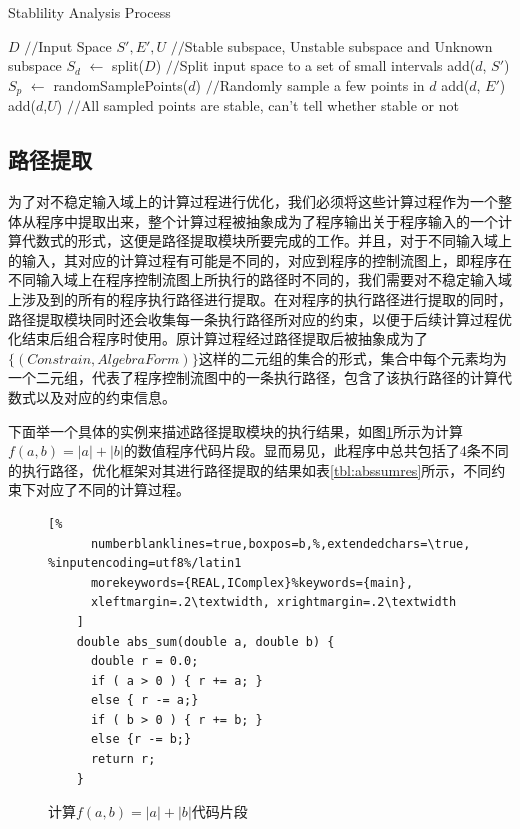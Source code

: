 \begin{algorithm}[thb]
  \caption{Stablility Analysis Process}
  \label{alg:stabilityAnalysis}
\begin{algorithmic}[1]
\REQUIRE $D$ {{\footnotesize$//$}\small Input Space}
\ENSURE $S', E', U$ {{\footnotesize$//$}\small Stable subspace, Unstable subspace and Unknown subspace}
\STATE $S_d$ $\leftarrow$ split($D$) {{\footnotesize$//$}\small Split input space to a set of small intervals}
\STATE add($d$, $S'$)
\ELSE
\STATE $S_p$ $\leftarrow$ randomSamplePoints($d$) {{\footnotesize$//$}\small Randomly sample a few points in $d$}
\STATE add($d$, $E'$)
\ENDIF
\ENDFOR
\STATE add($d$,$U$) {{\footnotesize$//$}\small All sampled points are stable, can't tell whether stable or not}
\ENDIF
\ENDFOR
\end{algorithmic}
\end{algorithm}

\subsection{路径提取}
为了对不稳定输入域上的计算过程进行优化，我们必须将这些计算过程作为一个整体从程序中提取出来，整个计算过程被抽象成为了程序输出关于程序输入的一个计算代数式的形式，这便是路径提取模块所要完成的工作。并且，对于不同输入域上的输入，其对应的计算过程有可能是不同的，对应到程序的控制流图上，即程序在不同输入域上在程序控制流图上所执行的路径时不同的，我们需要对不稳定输入域上涉及到的所有的程序执行路径进行提取。在对程序的执行路径进行提取的同时，路径提取模块同时还会收集每一条执行路径所对应的约束，以便于后续计算过程优化结束后组合程序时使用。原计算过程经过路径提取后被抽象成为了$\{(Constrain, AlgebraForm)\}$这样的二元组的集合的形式，集合中每个元素均为一个二元组，代表了程序控制流图中的一条执行路径，包含了该执行路径的计算代数式以及对应的约束信息。

下面举一个具体的实例来描述路径提取模块的执行结果，如图\ref{lst:symextexam}所示为计算$f(a,b)=|a|+|b|$的数值程序代码片段。显而易见，此程序中总共包括了4条不同的执行路径，优化框架对其进行路径提取的结果如表\ref{tbl:abssumres}所示，不同约束下对应了不同的计算过程。

\begin{figure}[thbp]
    \begin{lstlisting}[%
      numberblanklines=true,boxpos=b,%,extendedchars=\true, %inputencoding=utf8%/latin1
      morekeywords={REAL,IComplex}%keywords={main},
      xleftmargin=.2\textwidth, xrightmargin=.2\textwidth
    ]
    double abs_sum(double a, double b) {
      double r = 0.0;
      if ( a > 0 ) { r += a; } 
      else { r -= a;}
      if ( b > 0 ) { r += b; }
      else {r -= b;}
      return r;
    }
    \end{lstlisting}
    \caption{计算$f(a,b)=|a|+|b|$代码片段}
    \label{lst:symextexam}
\end{figure}

